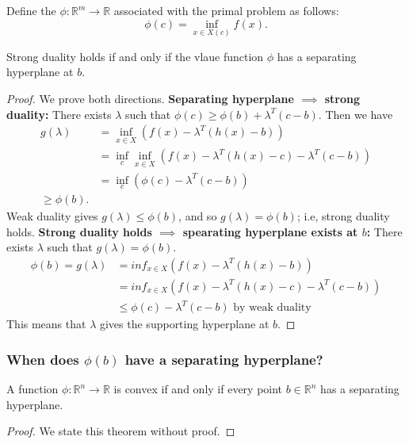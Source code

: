 \documentclass[a4paper]{scrartcl}
\begin{document}
\begin{definition}
	 Define the  $\phi: \mathbb{R}^{m} \to \mathbb{R} $ associated with the primal problem as follows: 
	 \[\phi (c)=\inf_{x \in X(c)}f(x).\]
\end{definition}

\begin{theorem}
	 Strong duality holds if and only if the vlaue function $\phi$ has a separating hyperplane at $b$.
\end{theorem}
\begin{proof}
	 We prove both directions.
	 \textbf{Separating hyperplane $\implies $ strong duality:}
	 There exists $\lambda$ such that $\phi(c)\geq \phi (b)+ \lambda^T (c-b)$.
	 Then we have
	 \begin{equation*}
		  \begin{split}
			  g (\lambda)&=\inf_{x \in X}(f (x)- \lambda^T (h (x)-b))\\
			  &=\inf_{c}\inf_{x \in X}(f (x)- \lambda^T (h (x)-c)-\lambda^T (c-b))\\
			  &=\inf_{c}(\phi(c)-\lambda^T (c-b))\\
			  \geq \phi(b).
		  \end{split}
	 \end{equation*}
	 Weak duality gives $g (\lambda)\leq \phi (b)$, and so $g (\lambda)=\phi(b)$; i.e, strong duality holds.
	 \textbf{Strong duality holds $\implies $ spearating hyperplane exists at $b$:}
	 There exists $\lambda$ such that $g (\lambda)=\phi (b)$.
	 \begin{equation*}
		\begin{split}
			\phi (b)=g (\lambda)&=inf_{x \in X} (f (x)-\lambda^T (h (x)-b))\\
			&=inf_{x \in X} (f (x)-\lambda^T (h (x)-c)-\lambda^T (c-b))\\
			&\leq \phi (c)- \lambda^T (c-b) \text{ by weak duality} 
		\end{split}
   \end{equation*}
	This means that $\lambda$ gives the supporting hyperplane at $b$.
\end{proof}

\subsubsection{When does $\phi (b)$ have a separating hyperplane?}
\begin{theorem}
	A function $\phi: \mathbb{R}^{n} \to \mathbb{R} $ is convex if and only if every point $b \in \mathbb{R}^{n} $ has a separating hyperplane.	\newline 
\end{theorem}
\begin{proof}
	We state this theorem without proof.
\end{proof}
\end{document}

